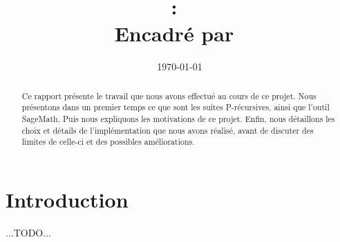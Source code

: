 \documentclass[12pt]{article}
\title{
\vspace{1in}
\textmd{\textbf{\hmwkClass:\ \hmwkTitle}}\\
\vspace{0.1in}\large{Encadré par\ \hmwkClassInstructor}
}
\author{\textbf{\hmwkAuthorName}}
\date{\today} %
\begin{document}
\maketitle
\begin{abstract}
    Ce rapport présente le travail que nous avons effectué au cours de ce projet.
    Nous présentons dans un premier temps ce que sont les suites P-récursives,
    ainsi que l'outil SageMath. Puis nous expliquons les motivations de ce projet.
    Enfin, nous détaillons les choix et détails de l'implémentation que nous avons réalisé,
    avant de discuter des limites de celle-ci et des possibles améliorations.
\end{abstract}


\setcounter{tocdepth}{1} %

\newpage
\tableofcontents
\newpage



\section{Introduction}
    \label{sec:intro}
    {\color{red} ...TODO...}
\end{document}

